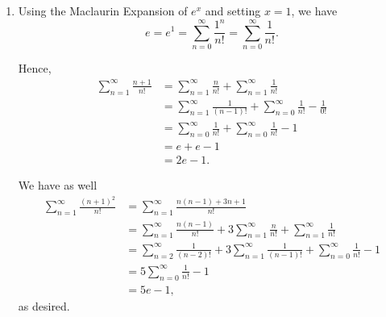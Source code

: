 \Question{\currfilebase}

\begin{enumerate}
    \item Using the Maclaurin Expansion of \(e^x\) and setting \(x = 1\), we have
          \[
              e = e^1 = \sum_{n = 0}^{\infty} \frac{1^n}{n!} = \sum_{n = 0}^{\infty} \frac{1}{n!}.
          \]

          Hence,
          \begin{align*}
              \sum_{n = 1}^{\infty} \frac{n + 1}{n!} & = \sum_{n = 1}^{\infty} \frac{n}{n!} + \sum_{n = 1}^{\infty} \frac{1}{n!}                      \\
                                                     & = \sum_{n = 1}^{\infty} \frac{1}{(n - 1)!} + \sum_{n = 0}^{\infty} \frac{1}{n!} - \frac{1}{0!} \\
                                                     & = \sum_{n = 0}^{\infty} \frac{1}{n!} + \sum_{n = 0}^{\infty} \frac{1}{n!} - 1                  \\
                                                     & = e + e - 1                                                                                    \\
                                                     & = 2e-1.
          \end{align*}

          We have as well
          \begin{align*}
              \sum_{n = 1}^{\infty} \frac{(n + 1)^2}{n!} & = \sum_{n = 1}^{\infty} \frac{n (n - 1) + 3n + 1}{n!}                                                                            \\
                                                         & = \sum_{n = 1}^{\infty} \frac{n(n - 1)}{n!} + 3 \sum_{n = 1}^{\infty} \frac{n}{n!} + \sum_{n = 1}^{\infty} \frac{1}{n!}          \\
                                                         & = \sum_{n = 2}^{\infty} \frac{1}{(n - 2)!} + 3 \sum_{n = 1}^{\infty} \frac{1}{(n - 1)!} + \sum_{n = 0}^{\infty} \frac{1}{n!} - 1 \\
                                                         & = 5\sum_{n = 0}^{\infty} \frac{1}{n!} - 1                                                                                        \\
                                                         & = 5e - 1,
          \end{align*}
          as desired.


\end{enumerate}
